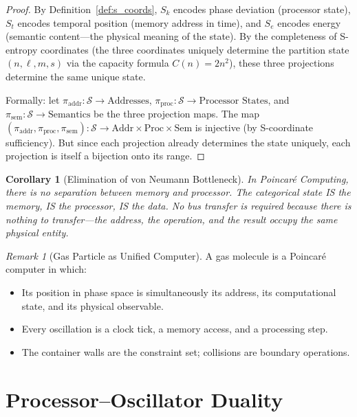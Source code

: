 \documentclass[twocolumn,10pt,a4paper]{article}
\theoremstyle{plain}
\newtheorem{corollary}[theorem]{Corollary}
\theoremstyle{definition}
\theoremstyle{remark}
\newtheorem{remark}[theorem]{Remark}
\newcommand{\Sspace}{\mathcal{S}}
\newcommand{\Sk}{S_k}
\newcommand{\St}{S_t}
\newcommand{\Se}{S_e}
\begin{document}
\begin{proof}
By Definition~\ref{def:s_coords}, $\Sk$ encodes phase deviation (processor state), $\St$ encodes temporal position (memory address in time), and $\Se$ encodes energy (semantic content---the physical meaning of the state). By the completeness of S-entropy coordinates (the three coordinates uniquely determine the partition state $(n, \ell, m, s)$ via the capacity formula $C(n) = 2n^2$), these three projections determine the same unique state.

Formally: let $\pi_{\mathrm{addr}} : \Sspace \to \text{Addresses}$, $\pi_{\mathrm{proc}} : \Sspace \to \text{Processor States}$, and $\pi_{\mathrm{sem}} : \Sspace \to \text{Semantics}$ be the three projection maps. The map $(\pi_{\mathrm{addr}}, \pi_{\mathrm{proc}}, \pi_{\mathrm{sem}}) : \Sspace \to \text{Addr} \times \text{Proc} \times \text{Sem}$ is injective (by S-coordinate sufficiency). But since each projection already determines the state uniquely, each projection is itself a bijection onto its range.
\end{proof}

\begin{corollary}[Elimination of von Neumann Bottleneck]
\label{cor:von_neumann}
In Poincar\'{e} Computing, there is no separation between memory and processor. The categorical state IS the memory, IS the processor, IS the data. No bus transfer is required because there is nothing to transfer---the address, the operation, and the result occupy the same physical entity.
\end{corollary}

\begin{remark}[Gas Particle as Unified Computer]
A gas molecule is a Poincar\'{e} computer in which:
\begin{itemize}
    \item Its position in phase space is simultaneously its address, its computational state, and its physical observable.
    \item Every oscillation is a clock tick, a memory access, and a processing step.
    \item The container walls are the constraint set; collisions are boundary operations.
\end{itemize}
\end{remark}

\section{Processor--Oscillator Duality}
\label{sec:duality}
\end{document}
